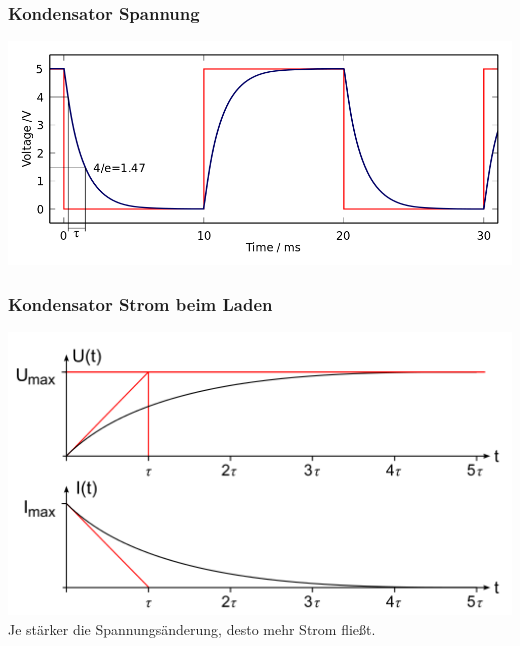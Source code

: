\begin{frame}
    \frametitle{Kondensator Spannung}
	\begin{center}
        \includegraphics[width=1\textwidth]{a03/Capacitor_Square_wave_charge-discharge.png}
                \tiny \hyperlink{refs}{\cite{wc}}
    \end{center}
\end{frame}

\begin{frame}
    \frametitle{Kondensator Strom beim Laden}
	\begin{center}
        \includegraphics[width=1\textwidth]{a03/Ladevorgang.png}
                \tiny \hyperlink{refs}{\cite{wc}}
        \Large{Je stärker die Spannungsänderung, desto mehr Strom fließt.}
    \end{center}
\end{frame}

